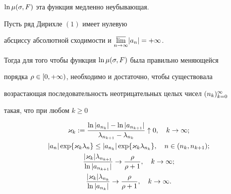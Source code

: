 $\ln\mu(\sigma,F)$ эта функция медленно неубывающая.





\begin{thm}


Пусть ряд Дирихле $(1)$ имеет нулевую


абсциссу абсолютной сходимости и $\underset{n\to\infty}\varlimsup{}|a_n|=+\infty$.


Тогда для того чтобы функция $\ln\mu(\sigma,F)$ была правильно меняющейся 


порядка $\rho\in[0,+\infty)$, необходимо и достаточно, чтобы существовала 


возрастающая последовательность неотрицательных целых чисел $(n_k)_{k=0}^\infty$


такая, что при любом $k\ge 0$


\begin{gather}


\k_k:=\frac{\ln|a_{n_k}|-\ln|a_{n_{k+1}}|}{\la_{n_{k+1}}-\la_{n_k}}


\uparrow 0,\quad k\to\i;\\


|a_n|\exp\{\k_k\la_n\}\le |a_{n_k}|\exp\{\k_k\la_{n_k}\},\quad


n\in(n_k,n_{k+1});\\


\frac{|\k_k|\la_{n_{k+1}}}{\ln|a_{n_{k+1}}|}\to\frac{\r}{\r+1},\quad


k\to\i;\\


\frac{|\k_k|\la_{n_k}}{\ln|a_{n_k}|}\to\frac{\r}{\r+1},\quad


k\to\i.


\end{gather}


\end{thm}





